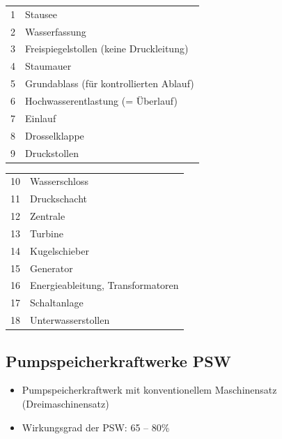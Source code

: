 \begin{minipage}[t]{0.48\columnwidth}
    \begin{tabular}{c l}
        1 & Stausee \\
        2 & Wasserfassung \\
        3 & Freispiegelstollen (keine Druckleitung) \\
        4 & Staumauer \\
        5 & Grundablass (für kontrollierten Ablauf) \\
        6 & Hochwasserentlastung (= Überlauf) \\
        7 & Einlauf \\
        8 & Drosselklappe \\
        9 & Druckstollen \\
    \end{tabular}
\end{minipage}
\hfill
\begin{minipage}[t]{0.48\columnwidth}
    \begin{tabular}{c l}
        10 & Wasserschloss \\
        11 & Druckschacht \\
        12 & Zentrale \\
        13 & Turbine \\
        14 & Kugelschieber \\
        15 & Generator \\
        16 & Energieableitung, Transformatoren \\
        17 & Schaltanlage \\
        18 & Unterwasserstollen \\
    \end{tabular}
\end{minipage}



\subsection{Pumpspeicherkraftwerke PSW}

\begin{itemize}
    \item Pumpspeicherkraftwerk mit konventionellem Maschinensatz (Dreimaschinensatz)
    \item Wirkungsgrad der PSW: 65 – 80\%
\end{itemize}

